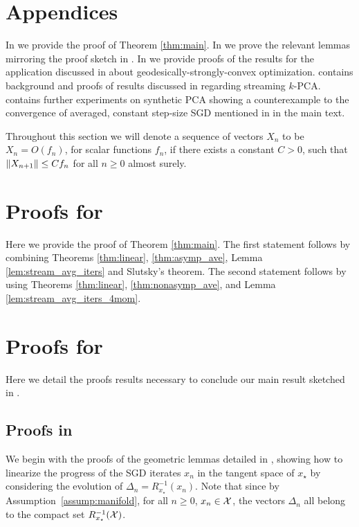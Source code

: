 \section{Appendices}

In  we provide the proof of Theorem \ref{thm:main}. In  we prove the relevant lemmas mirroring the proof sketch in . In  we provide proofs of the results for the application discussed in  about geodesically-strongly-convex optimization.  contains background and proofs of results discussed in  regarding streaming $k$-PCA.  contains further experiments on synthetic PCA showing a counterexample to the convergence of averaged, constant step-size SGD mentioned in  in the main text.

Throughout this section we will denote a sequence of vectors $X_{n}$ to be $X_{n} = O(f_n)$, for scalar functions $f_n$,
if there exists a constant $C>0$, such that $\norm{X_{n+1}} \leq C f_n$ for all $n \geq 0$ almost surely.
\section{Proofs for } \label{sec:main_proof}
Here we provide the proof of Theorem \ref{thm:main}. The first statement follows by combining Theorems \ref{thm:linear}, \ref{thm:asymp_ave}, Lemma \ref{lem:stream_avg_iters} and Slutsky's theorem. The second statement follows by using Theorems \ref{thm:linear}, \ref{thm:nonasymp_ave}, and Lemma \ref{lem:stream_avg_iters_4mom}.

\section{Proofs for } \label{sec:app_pfsketch}
Here we detail the proofs results necessary to conclude our main result sketched in
.

\subsection{Proofs in }
We begin with the proofs of the geometric lemmas detailed in ,
showing how to linearize the progress of the SGD iterates $x_n$ in the tangent space of $x_\star$ by considering the evolution of $\Delta_n = R_{x_\star}^{-1}(x_n)$. Note that since by Assumption~\ref{assump:manifold}, for all $n\geq0$, $x_n\in\mathcal{X}$, the vectors $\Delta_n$ all belong to the compact set $R_{x_\star}^{-1}(\mathcal{X})$.

